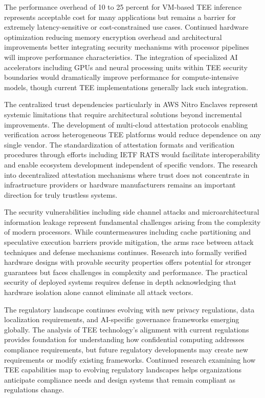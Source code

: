 The performance overhead of 10 to 25 percent for VM-based TEE inference represents acceptable cost for many applications but remains a barrier for extremely latency-sensitive or cost-constrained use cases. Continued hardware optimization reducing memory encryption overhead and architectural improvements better integrating security mechanisms with processor pipelines will improve performance characteristics. The integration of specialized AI accelerators including GPUs and neural processing units within TEE security boundaries would dramatically improve performance for compute-intensive models, though current TEE implementations generally lack such integration.

The centralized trust dependencies particularly in AWS Nitro Enclaves represent systemic limitations that require architectural solutions beyond incremental improvements. The development of multi-cloud attestation protocols enabling verification across heterogeneous TEE platforms would reduce dependence on any single vendor. The standardization of attestation formats and verification procedures through efforts including IETF RATS would facilitate interoperability and enable ecosystem development independent of specific vendors. The research into decentralized attestation mechanisms where trust does not concentrate in infrastructure providers or hardware manufacturers remains an important direction for truly trustless systems.

The security vulnerabilities including side channel attacks and microarchitectural information leakage represent fundamental challenges arising from the complexity of modern processors. While countermeasures including cache partitioning and speculative execution barriers provide mitigation, the arms race between attack techniques and defense mechanisms continues. Research into formally verified hardware designs with provable security properties offers potential for stronger guarantees but faces challenges in complexity and performance. The practical security of deployed systems requires defense in depth acknowledging that hardware isolation alone cannot eliminate all attack vectors.

The regulatory landscape continues evolving with new privacy regulations, data localization requirements, and AI-specific governance frameworks emerging globally. The analysis of TEE technology's alignment with current regulations provides foundation for understanding how confidential computing addresses compliance requirements, but future regulatory developments may create new requirements or modify existing frameworks. Continued research examining how TEE capabilities map to evolving regulatory landscapes helps organizations anticipate compliance needs and design systems that remain compliant as regulations change.

